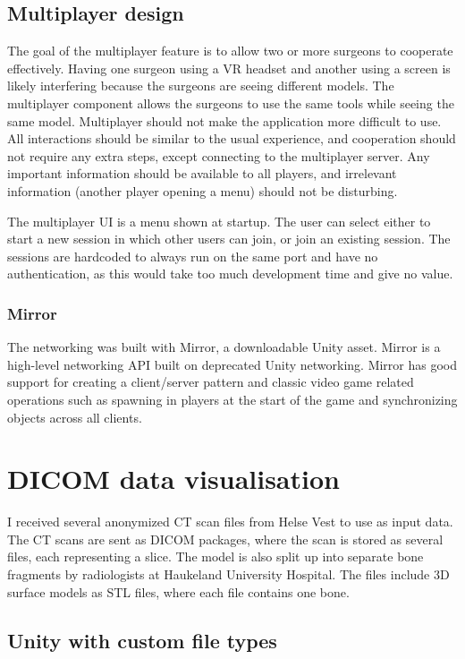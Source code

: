 \documentclass[a4paper]{report}
\begin{document}
\subsection{Multiplayer design}
The goal of the multiplayer feature is to allow two or more surgeons to cooperate effectively. Having one surgeon using a VR headset and another using a screen is likely interfering because the surgeons are seeing different models. The multiplayer component allows the surgeons to use the same tools while seeing the same model.
Multiplayer should not make the application more difficult to use. All interactions should be similar to the usual experience, and cooperation should not require any extra steps, except connecting to the multiplayer server. Any important information should be available to all players, and irrelevant information (another player opening a menu) should not be disturbing.

The multiplayer UI is a menu shown at startup. The user can select either to start a new session in which other users can join, or join an existing session. The sessions are hardcoded to always run on the same port and have no authentication, as this would take too much development time and give no value.

\subsubsection{Mirror}
The networking was built with Mirror, a downloadable Unity asset. Mirror is a high-level networking API built on deprecated Unity networking\cite{noauthor_mirror_nodate}. Mirror has good support for creating a client/server pattern and classic video game related operations such as spawning in players at the start of the game and synchronizing objects across all clients.

\section{DICOM data visualisation}
I received several anonymized CT scan files from Helse Vest to use as input data. The CT scans are sent as DICOM packages\cite{noauthor_dicom_nodate}, where the scan is stored as several files, each representing a slice.
The model is also split up into separate bone fragments by radiologists at Haukeland University Hospital. The files include 3D surface models as STL files, where each file contains one bone.


\subsection{Unity with custom file types}
\end{document}

